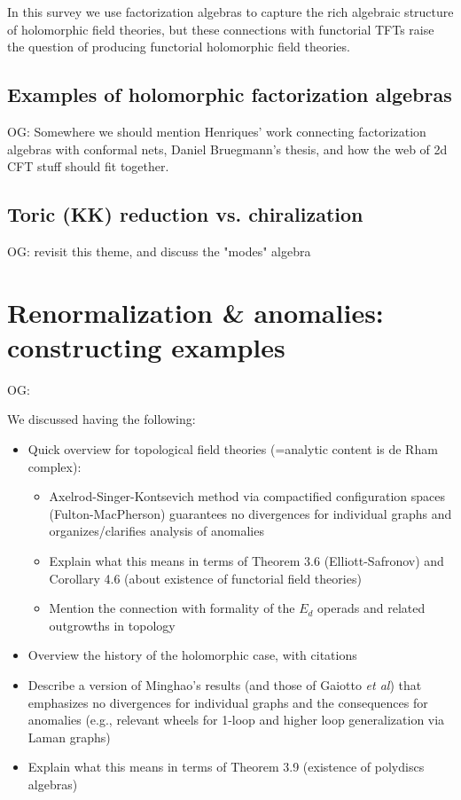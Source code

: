 \documentclass[11pt]{amsart}
\def\owen#1{{\textcolor{violet!50!black}{OG: {#1}}}}
\begin{document}
In this survey we use factorization algebras to capture the rich algebraic structure of holomorphic field theories,
but these connections with functorial TFTs raise the question of producing functorial holomorphic field theories.

\subsection{Examples of holomorphic factorization algebras}

\owen{Somewhere we should mention Henriques' work connecting factorization algebras with conformal nets,
Daniel Bruegmann's thesis, and how the web of 2d CFT stuff should fit together.}


\subsection{Toric (KK) reduction vs. chiralization}

\owen{revisit this theme, and discuss the "modes" algebra}

\section{Renormalization \& anomalies: constructing examples}
\label{sec: renorm}

\owen{We discussed having the following:
\begin{itemize}
\item Quick overview for topological field theories (=analytic content is de Rham complex): 
\begin{itemize}
\item Axelrod-Singer-Kontsevich method via compactified configuration spaces (Fulton-MacPherson) guarantees no divergences for individual graphs and organizes/clarifies analysis of anomalies
\item Explain what this means in terms of Theorem 3.6 (Elliott-Safronov) and Corollary 4.6 (about existence of functorial field theories)
\item Mention the connection with formality of the $E_d$ operads and related outgrowths in topology 
\end{itemize} 
\item Overview the history of the holomorphic case, with citations
\item Describe a version of Minghao's results (and those of Gaiotto {\it et al}) that emphasizes no divergences for individual graphs and the consequences for anomalies (e.g., relevant wheels for 1-loop and higher loop generalization via Laman graphs)
\item Explain what this means in terms of Theorem 3.9 (existence of polydiscs algebras)
\end{itemize}}
\end{document}
